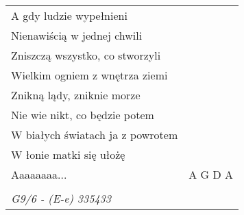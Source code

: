 \documentclass[a5paper]{article}
\begin{document}
\begin{tabular}{@{}p{7.50cm}p{3cm}@{}}
A gdy ludzie wypełnieni \\
Nienawiścią w jednej chwili \\
Zniszczą wszystko, co stworzyli \\
Wielkim ogniem z wnętrza ziemi \\
Znikną lądy, zniknie morze \\
Nie wie nikt, co będzie potem \\
W białych światach ja z powrotem \\
W łonie matki się ułożę \\
  Aaaaaaaa...& A G D A \\ \\

\emph{G9/6 - (E-e) 335433}
\end{tabular}
\end{document}
